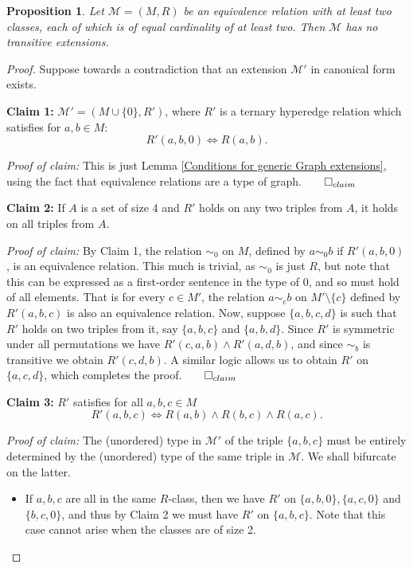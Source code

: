 \documentclass{amsart}
\newtheorem{proposition}[theorem]{Proposition}
\newcommand{\set}[1]{\{#1 \}}
\newcommand{\model}{\mathcal{M}}
\begin{document}
\begin{proposition}
    Let $\model = (M, R)$ be an equivalence relation with at least two classes, each of which is of equal cardinality of at least two. Then $\model$ has no transitive extensions.
\end{proposition}
\begin{proof}
    Suppose towards a contradiction that an extension $\model'$ in canonical form exists.

    \textbf{Claim 1:} $\model' = (M \cup \set{0}, R')$, where $R'$ is a ternary hyperedge relation which satisfies for $a,b \in M$:
    $$R'(a,b,0) \iff R(a,b).$$
    
    \textit{Proof of claim:} This is just Lemma \ref{Conditions for generic Graph extensions}, using the fact that equivalence relations are a type of graph.\hfill$\qed_{claim}$

    \textbf{Claim 2:} If $A$ is a set of size 4 and $R'$ holds on any two triples from $A$, it holds on all triples from $A$.

    \textit{Proof of claim:} By Claim 1, the relation $\sim_0$ on $M$, defined by $a \sim_0 b$ if $R'(a,b,0)$, is an equivalence relation. This much is trivial, as $\sim_0$ is just $R$, but note that this can be expressed as a first-order sentence in the type of $0$, and so must hold of all elements. That is for every $c \in M'$, the relation $a \sim_c b$ on $M' \setminus \{c\}$ defined by $R'(a,b,c)$ is also an equivalence relation. Now, suppose $\set{a,b,c,d}$ is such that $R'$ holds on two triples from it, say $\set{a,b,c}$ and $\set{a,b,d}$. Since $R'$ is symmetric under all permutations we have $R'(c,a,b) \wedge R'(a,d, b)$, and since $\sim_b$ is transitive we obtain $R'(c,d,b)$. A similar logic allows us to obtain $R'$ on $\set{a,c,d}$, which completes the proof.\hfill$\qed_{claim}$

    \textbf{Claim 3:} $R'$ satisfies for all $a,b,c \in M$
    $$R'(a,b,c) \iff R(a,b) \wedge R(b,c) \wedge R(a,c).$$

    \textit{Proof of claim:} The (unordered) type in $\model'$ of the triple $\{a,b,c\}$ must be entirely determined by the (unordered) type of the same triple in $\model$. We shall bifurcate on the latter.

    \begin{itemize}
    \item If $a,b,c$ are all in the same $R$-class, then we have $R'$ on $\{a,b,0\}, \{a,c, 0\}$ and $\{b,c,0\}$, and thus by Claim 2 we must have $R'$ on $\{a,b,c\}$. Note that this case cannot arise when the classes are of size 2.


\end{itemize}
\end{proof}
\end{document}
